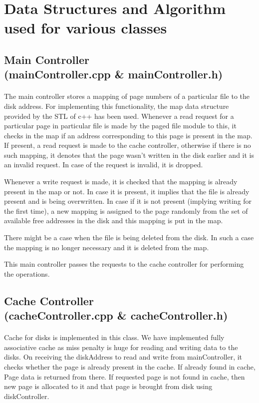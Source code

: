 \documentclass[11pt]{article}
\begin{document}
\section{Data Structures and Algorithm used for various classes}

\subsection{Main Controller \\ (mainController.cpp \& mainController.h)}
\paragraph{}
The main controller stores a mapping of page numbers of a particular file to the disk address. For implementing this functionality, the map data structure provided by the STL of c++ has been used. Whenever a read request for a particular page in particular file is made by the paged file module to this, it checks in the map if an address corresponding to this page is present in the map. If present, a read request is made to the cache controller, otherwise if there is no such mapping, it denotes that the page wasn't written in the disk earlier and it is an invalid request. In case of the request is invalid, it is dropped.

Whenever a write request is made, it is checked that the mapping is already present in the map or not. In case it is present, it implies that the file is already present and is being overwritten. In case if it is not present (implying writing for the first time), a new mapping is assigned to the page randomly from the set of available free addresses in the disk and this mapping is put in the map.

There might be a case when the file is being deleted from the disk. In such a case the mapping is no longer necessary and it is deleted from the map.

This main controller passes the requests to the cache controller for performing the operations.

\subsection{Cache Controller \\ (cacheController.cpp \& cacheController.h)}
\paragraph{}
Cache for disks is implemented in this class. We have implemented fully associative cache as miss penalty is huge for reading and writing data to the disks. On receiving the diskAddress to read and write from mainController, it checks whether the page is already present in the cache. If already found in cache, Page data is returned from there. If requested page is not found in cache, then new page is allocated to it and that page is brought from disk using diskController.
\end{document}
